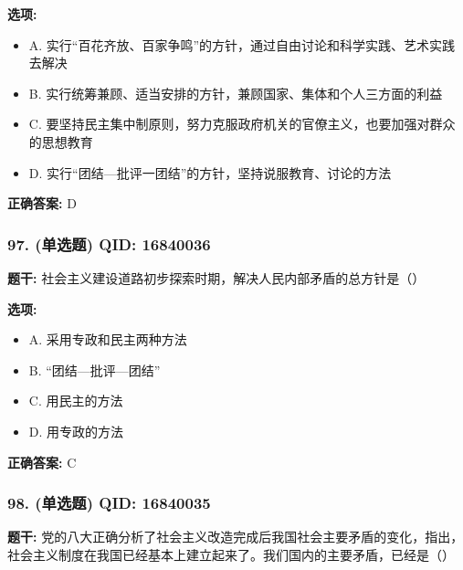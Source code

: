 \documentclass[12pt,UTF8]{ctexart}
\begin{document}
\textbf{选项:}
\begin{itemize}[leftmargin=*]

  \item A. 实行“百花齐放、百家争鸣”的方针，通过自由讨论和科学实践、艺术实践去解决

  \item B. 实行统筹兼顾、适当安排的方针，兼顾国家、集体和个人三方面的利益

  \item C. 要坚持民主集中制原则，努力克服政府机关的官僚主义，也要加强对群众的思想教育

  \item D. 实行“团结—批评一团结”的方针，坚持说服教育、讨论的方法

\end{itemize}

\textbf{正确答案:}
D

\vspace{0.3em}\hrulefill\vspace{0.7em}

\subsubsection*{97. (单选题) \small QID: 16840036}

\textbf{题干:}
社会主义建设道路初步探索时期，解决人民内部矛盾的总方针是（）

\textbf{选项:}
\begin{itemize}[leftmargin=*]

  \item A. 采用专政和民主两种方法

  \item B. “团结—批评—团结”

  \item C. 用民主的方法

  \item D. 用专政的方法

\end{itemize}

\textbf{正确答案:}
C

\vspace{0.3em}\hrulefill\vspace{0.7em}

\subsubsection*{98. (单选题) \small QID: 16840035}

\textbf{题干:}
党的八大正确分析了社会主义改造完成后我国社会主要矛盾的变化，指出，社会主义制度在我国已经基本上建立起来了。我们国内的主要矛盾，已经是（）
\end{document}
